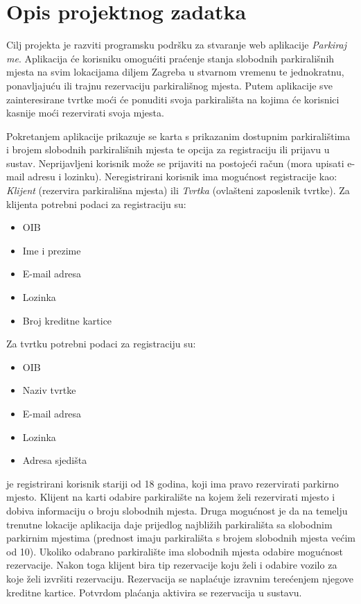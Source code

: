 \chapter{Opis projektnog zadatka}

Cilj projekta je razviti programsku podršku za stvaranje web aplikacije \textit {Parkiraj me}. Aplikacija će korisniku omogućiti praćenje stanja slobodnih parkirališnih mjesta na svim lokacijama diljem Zagreba u stvarnom vremenu te jednokratnu, ponavljajuću ili trajnu rezervaciju parkirališnog mjesta. Putem aplikacije sve zainteresirane tvrtke moći će ponuditi svoja parkirališta na kojima će korisnici kasnije moći rezervirati svoja mjesta.

Pokretanjem aplikacije prikazuje se karta s prikazanim dostupnim parkiralištima i brojem slobodnih parkirališnih mjesta te opcija za registraciju ili prijavu u sustav.\newline 
Neprijavljeni korisnik može se prijaviti na postojeći račun (mora upisati e-mail adresu i lozinku). Neregistrirani korisnik ima mogućnost registracije kao: \textit{Klijent} (rezervira parkirališna mjesta) ili \textit{Tvrtka} (ovlašteni zaposlenik tvrtke).
\newline
Za klijenta potrebni podaci za registraciju su:
\begin{itemize}
    \item OIB
    \item Ime i prezime
    \item E-mail adresa
    \item Lozinka
    \item Broj kreditne kartice
\end{itemize}
Za tvrtku potrebni podaci za registraciju su:
\begin{itemize}
    \item OIB
    \item Naziv tvrtke
    \item E-mail adresa
    \item Lozinka
    \item Adresa sjedišta
\end{itemize}

\textit{} je registrirani korisnik stariji od 18 godina, koji ima pravo rezervirati parkirno mjesto. Klijent na karti odabire parkiralište na kojem želi rezervirati mjesto i dobiva informaciju o broju slobodnih mjesta. Druga mogućnost je da na temelju trenutne lokacije aplikacija daje prijedlog najbližih parkirališta sa slobodnim parkirnim mjestima (prednost imaju parkirališta s brojem slobodnih mjesta većim od 10). Ukoliko odabrano parkiralište ima slobodnih mjesta odabire mogućnost rezervacije. Nakon toga klijent bira tip rezervacije koju želi i odabire vozilo za koje želi izvršiti rezervaciju. Rezervacija se naplaćuje izravnim terećenjem njegove kreditne kartice. Potvrdom plaćanja aktivira se rezervacija u sustavu. 

